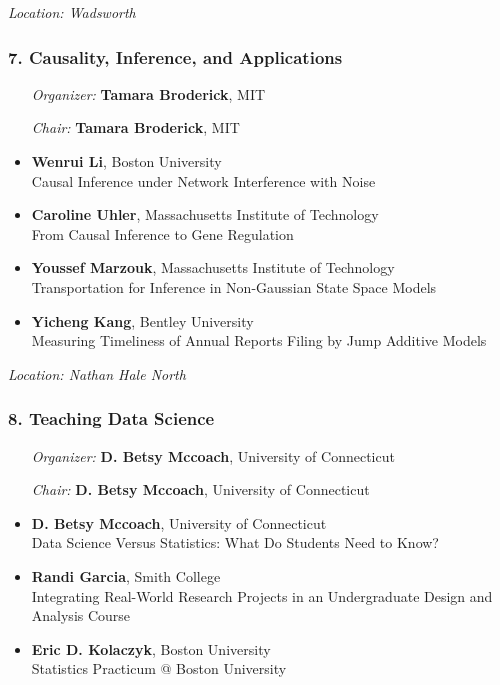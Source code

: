 \emph{Location: Wadsworth}

\subsubsection*{7. Causality, Inference, and Applications}

\begin{enumerate}[align=left]
\item [\emph{Organizer:}] \textbf{Tamara Broderick}, MIT
\item [\emph{Chair:}] \textbf{Tamara Broderick}, MIT
\end{enumerate}

\begin{itemize}
\item \textbf{Wenrui Li}, Boston University \\
Causal Inference under Network Interference with Noise
\item \textbf{Caroline Uhler}, Massachusetts Institute of Technology \\
From Causal Inference to Gene Regulation
\item \textbf{Youssef Marzouk}, Massachusetts Institute of Technology \\
Transportation for Inference in Non-Gaussian State Space Models
\item \textbf{Yicheng Kang}, Bentley University \\
Measuring Timeliness of Annual Reports Filing by Jump Additive Models
\end{itemize}

\emph{Location: Nathan Hale North}

\subsubsection*{8. Teaching Data Science}

\begin{enumerate}[align=left]
\item [\emph{Organizer:}] \textbf{D. Betsy Mccoach}, University of Connecticut
\item [\emph{Chair:}] \textbf{D. Betsy Mccoach}, University of Connecticut
\end{enumerate}

\begin{itemize}
\item \textbf{D. Betsy Mccoach}, University of Connecticut \\
Data Science Versus Statistics: What Do Students Need to Know?
\item \textbf{Randi Garcia}, Smith College \\
Integrating Real-World Research Projects in an Undergraduate Design and Analysis Course
\item \textbf{Eric D. Kolaczyk}, Boston University \\
Statistics Practicum @ Boston University
\end{itemize}

